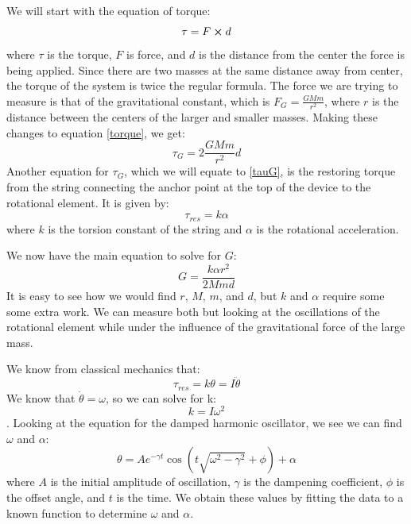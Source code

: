 \documentclass[aps,prl,10pt,twocolumn,floatfix]{revtex4-2}
\begin{document}
We will start with the equation of torque: 
\begin{equation} \label{torque}
\tau = F \cross d
\end{equation}
where $\tau$ is the torque, $F$ is force, and $d$ is the distance from the center the force is being applied. 
Since there are two masses at the same distance away from center, the torque of the system is twice the regular formula.
The force we are trying to measure is that of the gravitational constant, which is $F_G=\frac{G M m}{r^2}$, where $r$ is the distance between the centers of the larger and smaller masses.
Making these changes to equation \ref{torque}, we get:
\begin{equation}\label{tauG}
\tau_G=2\frac{G M m}{r^2} d
\end{equation}
Another equation for $\tau_G$, which we will equate to \ref{tauG}, is the restoring torque from the string connecting the anchor point at the top of the device to the rotational element. 
It is given by: 
\begin{equation}
\tau_{res}=k\alpha
\end{equation}
where $k$ is the torsion constant of the string and $\alpha$ is the rotational acceleration. 

We now have the main equation to solve for $G$:
\begin{equation}
G=\frac{k\alpha r^2}{2M m d}
\end{equation}
It is easy to see how we would find $r$, $M$, $m$, and $d$, but $k$ and $\alpha$ require some some extra work.
We can measure both but looking at the oscillations of the rotational element while under the influence of the gravitational force of the large mass.

We know from classical mechanics that:
\begin{equation}
\tau_{res}=k\theta=I\ddot{\theta}
\end{equation}
We know that $\dot{\theta} = \omega$, so we can solve for k:
\begin{equation}
k=I\omega^2
\end{equation}.
Looking at the equation for the damped harmonic oscillator, we see we can find $\omega$ and $\alpha$:
\begin{equation}
\theta = Ae^{-\gamma t} \cos{(t\sqrt{\omega^2-\gamma^2}+\phi)}+\alpha
\end{equation}
where $A$ is the initial amplitude of oscillation, $\gamma$ is the dampening coefficient, $\phi$ is the offset angle, and $t$ is the time.
We obtain these values by fitting the data to a known function to determine $\omega$ and $\alpha$.
\end{document}
